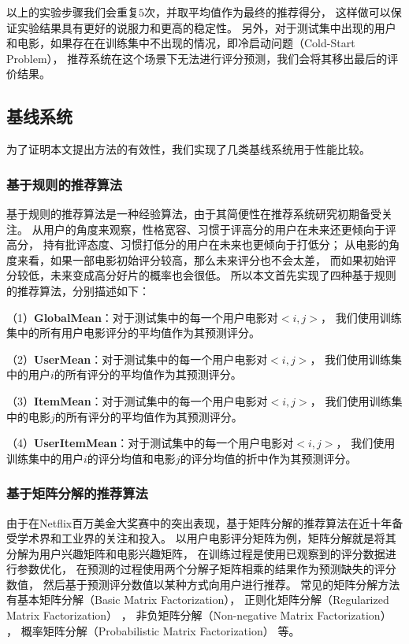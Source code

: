 以上的实验步骤我们会重复$5$次，并取平均值作为最终的推荐得分，
这样做可以保证实验结果具有更好的说服力和更高的稳定性。
另外，对于测试集中出现的用户和电影，如果存在在训练集中不出现的情况，即冷启动问题（Cold-Start Problem），
推荐系统在这个场景下无法进行评分预测，我们会将其移出最后的评价结果。

\subsection{基线系统}
为了证明本文提出方法的有效性，我们实现了几类基线系统用于性能比较。

\subsubsection{基于规则的推荐算法}
基于规则的推荐算法是一种经验算法，由于其简便性在推荐系统研究初期备受关注。
从用户的角度来观察，性格宽容、习惯于评高分的用户在未来还更倾向于评高分，
持有批评态度、习惯打低分的用户在未来也更倾向于打低分；
从电影的角度来看，如果一部电影初始评分较高，那么未来评分也不会太差，
而如果初始评分较低，未来变成高分好片的概率也会很低。
所以本文首先实现了四种基于规则的推荐算法，分别描述如下：

（1）\textbf{GlobalMean}：对于测试集中的每一个用户电影对$<i, j>$，
我们使用训练集中的所有用户电影评分的平均值作为其预测评分。

（2）\textbf{UserMean}：对于测试集中的每一个用户电影对$<i, j>$，
我们使用训练集中的用户$i$的所有评分的平均值作为其预测评分。

（3）\textbf{ItemMean}：对于测试集中的每一个用户电影对$<i, j>$，
我们使用训练集中的电影$j$的所有评分的平均值作为其预测评分。

（4）\textbf{UserItemMean}：对于测试集中的每一个用户电影对$<i, j>$，
我们使用训练集中的用户$i$的评分均值和电影$j$的评分均值的折中作为其预测评分。

\subsubsection{基于矩阵分解的推荐算法}
由于在Netflix百万美金大奖赛中的突出表现，基于矩阵分解的推荐算法在近十年备受学术界和工业界的关注和投入。
以用户电影评分矩阵为例，矩阵分解就是将其分解为用户兴趣矩阵和电影兴趣矩阵，
在训练过程是使用已观察到的评分数据进行参数优化，
在预测的过程使用两个分解子矩阵相乘的结果作为预测缺失的评分数值，
然后基于预测评分数值以某种方式向用户进行推荐。
常见的矩阵分解方法有基本矩阵分解（Basic Matrix Factorization），
正则化矩阵分解（Regularized Matrix Factorization）
\parencite{koren2009matrix}，
非负矩阵分解（Non-negative Matrix Factorization）
\parencite{lee2001algorithms}，
概率矩阵分解（Probabilistic Matrix Factorization）
\parencite{salakhutdinov2007probabilistic}等。

